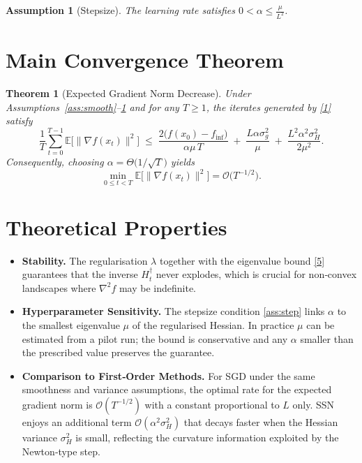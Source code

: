 \documentclass{article}
\newcommand{\E}{\mathbb{E}}
\newtheorem{assumption}{Assumption}
\newtheorem{theorem}{Theorem}
\begin{document}
\begin{assumption}[Stepsize]\label{ass:step}
The learning rate satisfies $0<\alpha\le \frac{\mu}{L^{2}}$.
\end{assumption}

\section*{Main Convergence Theorem}
\begin{theorem}[Expected Gradient Norm Decrease]\label{thm:main}
Under Assumptions~\ref{ass:smooth}–\ref{ass:step} and for any $T\ge1$, the iterates generated by \eqref{1} satisfy
\[
\frac{1}{T}\sum_{t=0}^{T-1}\E\!\big[\|\nabla f(x_t)\|^{2}\big]
\;\le\;
\frac{2\big(f(x_0)-f_{\inf}\big)}{\alpha\mu\,T}
\;+\;
\frac{L\alpha\sigma_{g}^{2}}{\mu}
\;+\;
\frac{L^{2}\alpha^{2}\sigma_{H}^{2}}{2\mu^{2}} .
\tag{6}
\]
Consequently, choosing $\alpha = \Theta\!\big(1/\sqrt{T}\big)$ yields
\[
\min_{0\le t<T}\E\!\big[\|\nabla f(x_t)\|^{2}\big]=\mathcal{O}\!\big(T^{-1/2}\big).
\]
\end{theorem}

\section*{Theoretical Properties}
\begin{itemize}[leftmargin=*]
\item \textbf{Stability.} The regularisation $\lambda$ together with the eigenvalue bound \eqref{5} guarantees that the inverse $H_t^{\dagger}$ never explodes, which is crucial for non‑convex landscapes where $\nabla^{2}f$ may be indefinite.
\item \textbf{Hyperparameter Sensitivity.} The stepsize condition \eqref{ass:step} links $\alpha$ to the smallest eigenvalue $\mu$ of the regularised Hessian. In practice $\mu$ can be estimated from a pilot run; the bound is conservative and any $\alpha$ smaller than the prescribed value preserves the guarantee.
\item \textbf{Comparison to First‑Order Methods.} For SGD under the same smoothness and variance assumptions, the optimal rate for the expected gradient norm is $\mathcal{O}(T^{-1/2})$ with a constant proportional to $L$ only. SSN enjoys an additional term $\mathcal{O}(\alpha^{2}\sigma_{H}^{2})$ that decays faster when the Hessian variance $\sigma_{H}^{2}$ is small, reflecting the curvature information exploited by the Newton‑type step.
\end{itemize}
\end{document}
